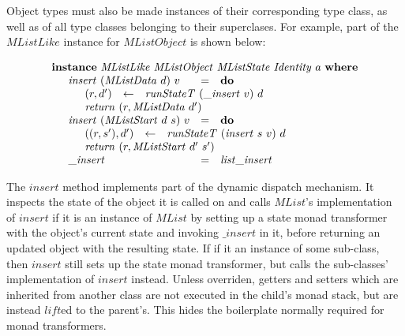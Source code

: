 \documentclass[runningheads,a4paper]{llncs}
\begin{document}
Object types must also be made instances of their corresponding type class, as well as of all type classes belonging to their superclases. For example, part of the $\mathit{MListLike}$ instance for $\mathit{MListObject}$ is shown below:

\begin{displaymath}
\begin{array}{l}
\mathbf{instance}~\mathit{MListLike}~\mathit{MListObject}~\mathit{MListState}~\mathit{Identity}~a~\mathbf{where} \\
\quad \begin{array}{lcl}
\mathit{insert}~(\mathit{MListData}~d)~v & = & \mathbf{do} \\
\multicolumn{3}{l}{\quad \begin{array}{lcl}
(r,d') & \leftarrow & \mathit{runStateT}~(\_\mathit{insert}~v)~d \\
\multicolumn{3}{l}{\mathit{return}~(r,\mathit{MListData}~d')}
\end{array}} \\
\mathit{insert}~(\mathit{MListStart}~d~s)~v & = & \mathbf{do} \\
\multicolumn{3}{l}{\quad \begin{array}{lcl}
((r,s'),d') & \leftarrow & \mathit{runStateT}~(\mathit{insert}~s~v)~d \\
\multicolumn{3}{l}{\mathit{return}~(r,\mathit{MListStart}~d'~s')}
\end{array}} \\
\_\mathit{insert} & = & \mathit{list}\_\mathit{insert}
\end{array}
\end{array}
\end{displaymath}

The $\mathit{insert}$ method implements part of the dynamic dispatch mechanism. It inspects the state of the object it is called on and calls $\mathit{MList}$'s implementation of $\mathit{insert}$ if it is an instance of $\mathit{MList}$ by setting up a state monad transformer with the object's current state and invoking $\_\mathit{insert}$ in it, before returning an updated object with the resulting state. If if it an instance of some sub-class, then $\mathit{insert}$ still sets up the state monad transformer, but calls the sub-classes' implementation of $\mathit{insert}$ instead. Unless overriden, getters and setters which are inherited from another class are not executed in the child's monad stack, but are instead $\mathit{lift}$ed to the parent's. This hides the boilerplate normally required for monad transformers.
\end{document}
